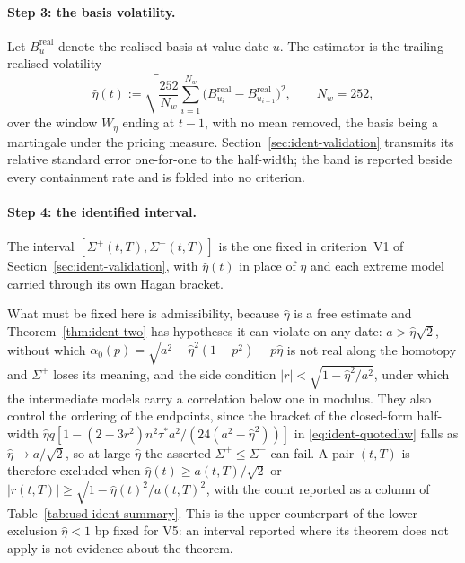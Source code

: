 \documentclass[../../../main.tex]{subfiles}
\begin{document}

\paragraph{Step 3: the basis volatility.} Let $B^{\mathrm{real}}_u$ denote the realised basis at value date $u$. The estimator is the trailing realised volatility
\[
\hat\eta(t):=\sqrt{\frac{252}{N_w}\sum_{i=1}^{N_w}\big(B^{\mathrm{real}}_{u_i}-B^{\mathrm{real}}_{u_{i-1}}\big)^2},\qquad N_w=252,
\]
over the window $W_\eta$ ending at $t-1$, with no mean removed, the basis being a martingale under the pricing measure. Section~\ref{sec:ident-validation} transmits its relative standard error one-for-one to the half-width; the band is reported beside every containment rate and is folded into no criterion.

\paragraph{Step 4: the identified interval.} The interval $[\Sigma^+(t,T),\Sigma^-(t,T)]$ is the one fixed in criterion~V1 of Section~\ref{sec:ident-validation}, with $\hat\eta(t)$ in place of $\eta$ and each extreme model carried through its own Hagan bracket.

What must be fixed here is admissibility, because $\hat\eta$ is a free estimate and Theorem~\ref{thm:ident-two} has hypotheses it can violate on any date: $a>\hat\eta\sqrt2$, without which $\alpha_0(p)=\sqrt{a^2-\hat\eta^2(1-p^2)}-p\hat\eta$ is not real along the homotopy and $\Sigma^+$ loses its meaning, and the side condition $|r|<\sqrt{1-\hat\eta^2/a^2}$, under which the intermediate models carry a correlation below one in modulus. They also control the ordering of the endpoints, since the bracket of the closed-form half-width $\hat\eta q[1-(2-3r^2)n^2\tau^*a^2/(24(a^2-\hat\eta^2))]$ in \eqref{eq:ident-quotedhw} falls as $\hat\eta\to a/\sqrt2$, so at large $\hat\eta$ the asserted $\Sigma^+\le\Sigma^-$ can fail. A pair $(t,T)$ is therefore excluded when $\hat\eta(t)\ge a(t,T)/\sqrt2$ or $|r(t,T)|\ge\sqrt{1-\hat\eta(t)^2/a(t,T)^2}$, with the count reported as a column of Table~\ref{tab:usd-ident-summary}. This is the upper counterpart of the lower exclusion $\hat\eta<1$ bp fixed for V5: an interval reported where its theorem does not apply is not evidence about the theorem.
\end{document}
